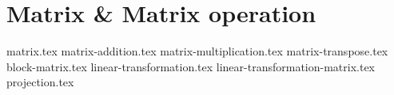 \chapter{Matrix \& Matrix operation}
{matrix.tex}
{matrix-addition.tex}
{matrix-multiplication.tex}
{matrix-transpose.tex}
{block-matrix.tex}
{linear-transformation.tex}
{linear-transformation-matrix.tex}
{projection.tex}